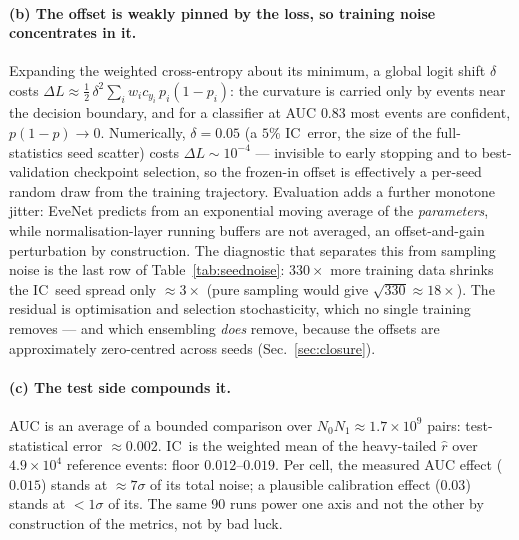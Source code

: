 \documentclass[11pt]{article}
\newcommand{\IC}{\ensuremath{\mathrm{IC}}}
\begin{document}
\paragraph{(b) The offset is weakly pinned by the loss, so training noise concentrates in
it.} Expanding the weighted cross-entropy about its minimum, a global logit shift
$\delta$ costs $\Delta L \approx \tfrac12\,\delta^2 \sum_i w_i c_{y_i}\, p_i(1-p_i)$: the
curvature is carried only by events near the decision boundary, and for a classifier at
AUC $0.83$ most events are confident, $p(1-p)\to 0$. Numerically, $\delta = 0.05$ (a $5\%$
\IC\ error, the size of the full-statistics seed scatter) costs
$\Delta L \sim 10^{-4}$ --- invisible to early stopping and to best-validation checkpoint
selection, so the frozen-in offset is effectively a per-seed random draw from the
training trajectory. Evaluation adds a further monotone jitter: EveNet predicts from an
exponential moving average of the \emph{parameters}, while normalisation-layer running
buffers are not averaged, an offset-and-gain perturbation by construction. The diagnostic
that separates this from sampling noise is the last row of Table~\ref{tab:seednoise}:
$330\times$ more training data shrinks the \IC\ seed spread only ${\approx}3\times$
(pure sampling would give $\sqrt{330}\approx 18\times$). The residual is optimisation and
selection stochasticity, which no single training removes --- and which ensembling
\emph{does} remove, because the offsets are approximately zero-centred across seeds
(Sec.~\ref{sec:closure}).

\paragraph{(c) The test side compounds it.} AUC is an average of a bounded comparison over
$N_0 N_1 \approx 1.7\times10^{9}$ pairs: test-statistical error ${\approx}0.002$. \IC\ is
the weighted mean of the heavy-tailed $\hat r$ over $4.9\times10^{4}$ reference events:
floor $0.012$--$0.019$. Per cell, the measured AUC effect ($0.015$) stands at
${\approx}7\sigma$ of its total noise; a plausible calibration effect ($0.03$) stands at
$<1\sigma$ of its. The same 90 runs power one axis and not the other by construction of
the metrics, not by bad luck.
\end{document}

